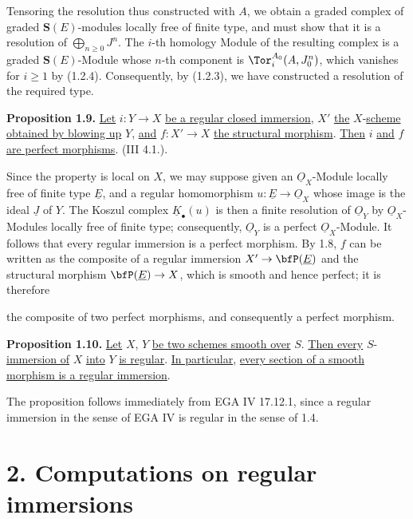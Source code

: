 Tensoring the resolution thus constructed with \(A\), we obtain a graded complex of graded \(\mathbf{S}(E)\)-modules locally free of finite type, and must show that it is a resolution of \(\bigoplus_{n\ge0}J^n\). The \(i\)-th homology Module of the resulting complex is a graded \(\mathbf{S}(E)\)-Module whose \(n\)-th component is \(\Tor_i^{A_0}(A,J_0^n)\), which vanishes for \(i\ge1\) by (1.2.4). Consequently, by (1.2.3), we have constructed a resolution of the required type.

\textbf{Proposition 1.9.} \uline{Let} \(i:Y\to X\) \uline{be a regular closed immersion}, \(X'\) \uline{the} \(X\)-\uline{scheme obtained by blowing up} \(Y\), \uline{and} \(f:X'\to X\) \uline{the structural morphism}. \uline{Then} \(i\) \uline{and} \(f\) \uline{are perfect morphisms}. (III 4.1.).

Since the property is local on \(X\), we may suppose given an \(\underline{O}_X\)-Module locally free of finite type \(\underline{E}\), and a regular homomorphism \(u:\underline{E}\to\underline{O}_X\) whose image is the ideal \(\underline{J}\) of \(Y\). The Koszul complex \(\underline{K}_\bullet(u)\) is then a finite resolution of \(\underline{O}_Y\) by \(\underline{O}_X\)-Modules locally free of finite type; consequently, \(\underline{O}_Y\) is a perfect \(\underline{O}_X\)-Module. It follows that every regular immersion is a perfect morphism. By 1.8, \(f\) can be written as the composite of a regular immersion \(X'\to\bfP(\underline{E})\) and the structural morphism \(\bfP(\underline{E})\to X\), which is smooth and hence perfect; it is therefore

%
the composite of two perfect morphisms, and consequently a perfect morphism.

\textbf{Proposition 1.10.} \uline{Let} \(X\), \(Y\) \uline{be two schemes smooth over} \(S\). \uline{Then every} \(S\)-\uline{immersion of} \(X\) \uline{into} \(Y\) \uline{is regular}. \uline{In particular}, \uline{every section of a smooth morphism is a regular immersion}.

The proposition follows immediately from EGA IV 17.12.1, since a regular immersion in the sense of EGA IV is regular in the sense of 1.4.

\section*{2. Computations on regular immersions}

